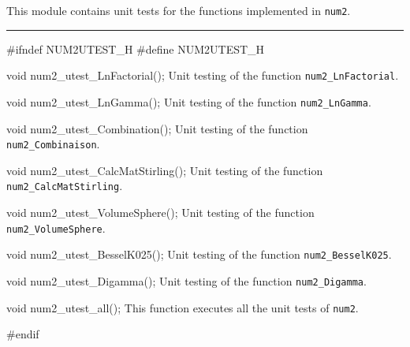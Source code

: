 
This module contains unit tests for the functions implemented in {\tt num2}. 

\bigskip
\hrule
\code
\hide
#ifndef NUM2UTEST_H
#define NUM2UTEST_H
\endhide
\endcode

\code
void num2_utest_LnFactorial();
\endcode
 \tab  Unit testing of the function {\tt num2\_LnFactorial}.
 \endtab
\code

void num2_utest_LnGamma();
\endcode
 \tab  Unit testing of the function {\tt num2\_LnGamma}.
 \endtab
\code

void num2_utest_Combination();
\endcode
 \tab  Unit testing of the function {\tt num2\_Combinaison}.
 \endtab
\code

void num2_utest_CalcMatStirling();
\endcode
 \tab  Unit testing of the function {\tt num2\_CalcMatStirling}.
 \endtab
\code

void num2_utest_VolumeSphere();
\endcode
 \tab  Unit testing of the function {\tt num2\_VolumeSphere}.
 \endtab
\code

void num2_utest_BesselK025();
\endcode
 \tab  Unit testing of the function {\tt num2\_BesselK025}.
 \endtab
\code

void num2_utest_Digamma();
\endcode
 \tab  Unit testing of the function {\tt num2\_Digamma}.
 \endtab
\code

void num2_utest_all();
\endcode
 \tab  This function executes all the unit tests of {\tt num2}.
 \endtab
\code


\hide
#endif
\endhide
\endcode
